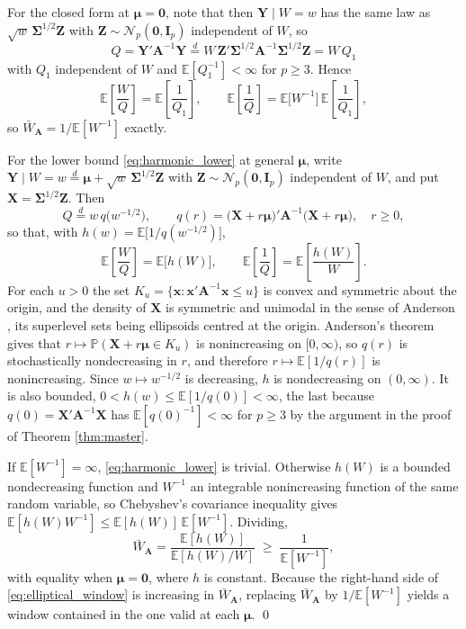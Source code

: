 \documentclass[pdflatex,sn-mathphys-num]{sn-jnl}%
\theoremstyle{thmstyleone}%
\theoremstyle{thmstyletwo}%
\theoremstyle{thmstylethree}%
\newenvironment{revblock}{\color{blue}}{}
\newcommand{\E}{\mathbb{E}}
\begin{document}
\begin{appendices}
For the closed form at $\bm\mu=\bm 0$, note that then $\bm Y\mid W=w$ has the same law as $\sqrt w\,\bm\Sigma^{1/2}\bm Z$ with $\bm Z\sim\mathcal N_p(\bm 0,\bm I_p)$ independent of $W$, so
\begin{equation}
Q=\bm Y'\bm A^{-1}\bm Y
\stackrel{d}{=}
W\,\bm Z'\bm\Sigma^{1/2}\bm A^{-1}\bm\Sigma^{1/2}\bm Z
=W\,Q_1
\end{equation}
with $Q_1$ independent of $W$ and $\E[Q_1^{-1}]<\infty$ for $p\ge3$. Hence
\begin{equation}
\E\left[\frac WQ\right]=\E\left[\frac{1}{Q_1}\right],
\qquad
\E\left[\frac 1Q\right]=\E\bigl[W^{-1}\bigr]\,\E\left[\frac{1}{Q_1}\right],
\end{equation}
so $\bar W_{\bm A}=1/\E[W^{-1}]$ exactly.

\begin{revblock}
For the lower bound \eqref{eq:harmonic_lower} at general $\bm\mu$, write $\bm Y\mid W=w\stackrel{d}{=}\bm\mu+\sqrt w\,\bm\Sigma^{1/2}\bm Z$ with $\bm Z\sim\mathcal N_p(\bm 0,\bm I_p)$ independent of $W$, and put $\bm X=\bm\Sigma^{1/2}\bm Z$. Then
\begin{equation}
Q\stackrel{d}{=}w\,q\bigl(w^{-1/2}\bigr),
\qquad
q(r)=\bigl(\bm X+r\bm\mu\bigr)'\bm A^{-1}\bigl(\bm X+r\bm\mu\bigr),
\quad r\ge0,
\end{equation}
so that, with $h(w)=\E\bigl[1/q(w^{-1/2})\bigr]$,
\begin{equation}
\E\left[\frac{W}{Q}\right]=\E\bigl[h(W)\bigr],
\qquad
\E\left[\frac{1}{Q}\right]=\E\left[\frac{h(W)}{W}\right].
\end{equation}
For each $u>0$ the set $K_u=\{\bm x:\bm x'\bm A^{-1}\bm x\le u\}$ is convex and symmetric about the origin, and the density of $\bm X$ is symmetric and unimodal in the sense of Anderson \cite{anderson1955}, its superlevel sets being ellipsoids centred at the origin. Anderson's theorem gives that $r\mapsto\mathbb P(\bm X+r\bm\mu\in K_u)$ is nonincreasing on $[0,\infty)$, so $q(r)$ is stochastically nondecreasing in $r$, and therefore $r\mapsto\E[1/q(r)]$ is nonincreasing. Since $w\mapsto w^{-1/2}$ is decreasing, $h$ is nondecreasing on $(0,\infty)$. It is also bounded, $0<h(w)\le\E[1/q(0)]<\infty$, the last because $q(0)=\bm X'\bm A^{-1}\bm X$ has $\E[q(0)^{-1}]<\infty$ for $p\ge3$ by the argument in the proof of Theorem \ref{thm:master}.

If $\E[W^{-1}]=\infty$, \eqref{eq:harmonic_lower} is trivial. Otherwise $h(W)$ is a bounded nondecreasing function and $W^{-1}$ an integrable nonincreasing function of the same random variable, so Chebyshev's covariance inequality gives $\E[h(W)W^{-1}]\le\E[h(W)]\,\E[W^{-1}]$. Dividing,
\begin{equation}
\bar W_{\bm A}=\frac{\E[h(W)]}{\E[h(W)/W]}\;\ge\;\frac{1}{\E[W^{-1}]} ,
\end{equation}
with equality when $\bm\mu=\bm 0$, where $h$ is constant. Because the right-hand side of \eqref{eq:elliptical_window} is increasing in $\bar W_{\bm A}$, replacing $\bar W_{\bm A}$ by $1/\E[W^{-1}]$ yields a window contained in the one valid at each $\bm\mu$.
\end{revblock}
\qed


\end{appendices}
\end{document}
